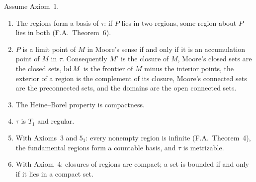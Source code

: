 \begin{proposition}\label{prop:bridge}
Assume Axiom~1.
\begin{enumerate}[label=(\alph*)]
\item The regions form a basis of $\tau$: if $P$ lies in two regions, some region about $P$ lies in
both (F.A.\ Theorem~6).
\item $P$ is a limit point of $M$ in Moore's sense if and only if it is an accumulation point of $M$ in
$\tau$. Consequently $M'$ is the closure of $M$, Moore's closed sets are the closed sets, $\operatorname{bd} M$ is the
frontier of $M$ minus the interior points, the exterior of a region is the complement of its closure,
Moore's connected sets are the preconnected sets, and the domains are the open connected sets.
\item The Heine--Borel property is compactness.
\item $\tau$ is $T_1$ and regular.
\item With Axioms~3 and $5_1$: every nonempty region is infinite (F.A.\ Theorem~4), the fundamental regions
form a countable basis, and $\tau$ is metrizable.
\item With Axiom~4: closures of regions are compact; a set is bounded if and only if it lies in a
compact set.
\end{enumerate}
\end{proposition}

